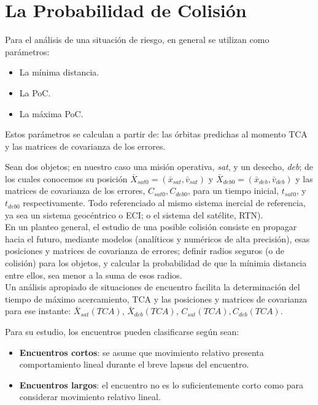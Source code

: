{\section{La Probabilidad de Colisi\'on}
Para el an\'alisis de una situaci\'on de riesgo, en general se utilizan como par\'ametros:\\


\begin{itemize}
\centering
\itemsep0em
\item La m\'inima distancia.
\item La PoC.
\item La m\'axima PoC.
\end{itemize}


Estos par\'ametros se calculan a partir de: las \'orbitas predichas al momento TCA y las matrices de covarianza de los errores.

Sean dos objetos; en nuestro caso una misi\'on operativa, {\it{sat}}, y un desecho, {\it{deb}}; de los cuales conocemos su posici\'on $\bar{X}_{sat0}=(\bar{x}_{sat},\bar{v}_{sat})$ y $\bar{X}_{deb0}=(\bar{x}_{deb},\bar{v}_{deb})$ y las matrices de covarianza de los errores, $C_{sat0}, C_{deb0}$, para un tiempo inicial, $t_{sat0}$, y $t_{deb0}$ respectivamente. Todo referenciado al mismo sistema inercial de referencia, ya sea un sistema geoc\'entrico o \ac{ECI}; o el sistema del sat\'elite, \ac{RTN}).\\
En un planteo general, el estudio de una posible colisi\'on consiste en propagar hacia el futuro, mediante modelos (anal\'iticos y num\'ericos de alta precisi\'on), esas posiciones y matrices de covarianza de errores; definir radios seguros (o de colisi\'on) para los objetos, y calcular la probabilidad de que la m\'inimia distancia entre ellos, sea menor a la suma de esos radios.\\
Un an\'alisis apropiado de situaciones de encuentro facilita la determinaci\'on del tiempo de m\'aximo acercamiento, TCA y las posiciones y matrices de covarianza para ese instante:  $\bar{X}_{sat}(TCA)$, $\bar{X}_{deb}(TCA)$, $C_{sat}(TCA), C_{deb}(TCA)$.

Para su estudio, los encuentros pueden clasificarse seg\'un sean:

\begin{itemize}
 \item {\bf{Encuentros cortos}}: se asume que movimiento relativo presenta comportamiento lineal durante el breve lapsus del encuentro.
 \item {\bf{Encuentros largos}}: el encuentro no es lo suficientemente corto como para considerar movimiento relativo lineal.
\end{itemize}

}
